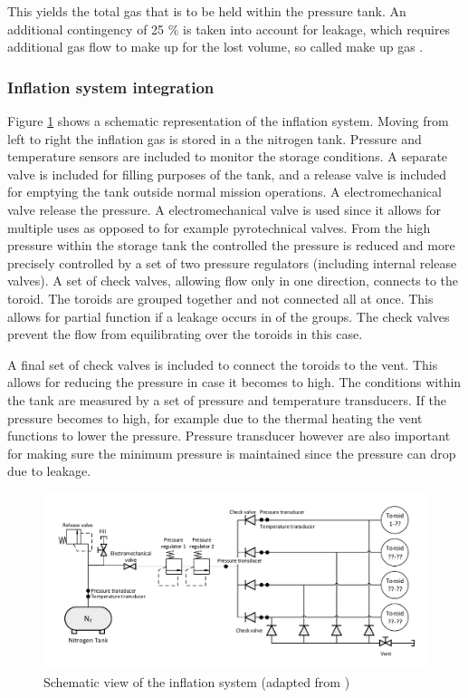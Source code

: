This yields the total gas that is to be held within the pressure tank. An additional contingency of 25 $\%$ is taken into account for leakage, which requires additional gas flow to make up for the lost volume, so called make up gas \cite{Jenkins2001}.

\subsubsection{Inflation system integration}


Figure \ref{fig:infsys} shows a schematic representation of the inflation system. Moving from left to right the inflation gas is stored in a the nitrogen tank. Pressure and temperature sensors are included to monitor the storage conditions. A separate valve is included for filling purposes of the tank, and a release valve is included for emptying the tank outside normal mission operations. A electromechanical valve release the pressure. A electromechanical valve is used since it allows for multiple uses as opposed to for example pyrotechnical valves. From the high pressure within the storage tank the controlled the pressure is reduced and more precisely controlled by a set of two pressure regulators (including internal release valves). A set of check valves, allowing flow only in one direction, connects to the toroid. The toroids are grouped together and not connected all at once. This allows for partial function if a leakage occurs in of the groups. The check valves prevent the flow from equilibrating over the toroids in this case.

A final set of check valves is included to connect the toroids to the vent. This allows for reducing the pressure in case it becomes to high. The conditions within the tank are measured by a set of pressure and temperature transducers. If the pressure becomes to high, for example due to the thermal heating the vent functions to lower the pressure. Pressure transducer however are also important for making sure the minimum pressure is maintained since the pressure can drop due to leakage. 

\begin{figure}[h]
		\centering
		\includegraphics[width=1.0\textwidth]{./Figure/Structure/infsys.pdf}
		\caption{Schematic view of the inflation system (adapted from \cite{Hughes2005})}
		\label{fig:infsys}
\end{figure}






